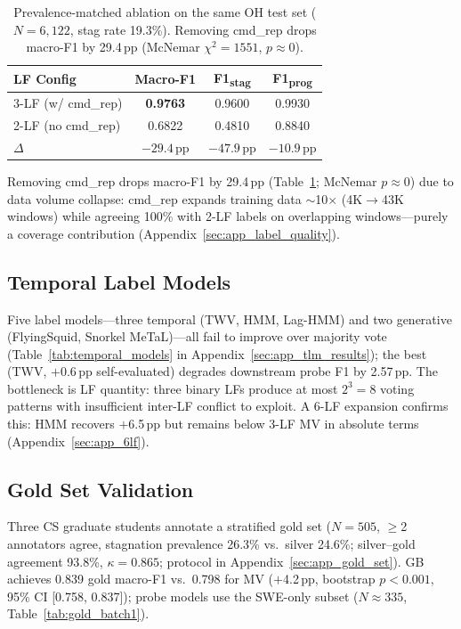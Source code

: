 \begin{table}[t]
\centering
\small
\begin{tabular}{lccc}
\toprule
\textbf{LF Config} & \textbf{Macro-F1} & \textbf{F1\textsubscript{stag}} & \textbf{F1\textsubscript{prog}} \\
\midrule
3-LF (w/ cmd\_rep) & \textbf{0.9763} & 0.9600 & 0.9930 \\
2-LF (no cmd\_rep) & 0.6822 & 0.4810 & 0.8840 \\
\midrule
$\Delta$ & $-29.4$\,pp & $-47.9$\,pp & $-10.9$\,pp \\
\bottomrule
\end{tabular}
\caption{Prevalence-matched ablation on the same OH test set ($N{=}6{,}122$, stag rate 19.3\%). Removing cmd\_rep drops macro-F1 by 29.4\,pp (McNemar $\chi^2{=}1551$, $p{\approx}0$).}
\label{tab:cmd_rep_ablation}
\end{table}

Removing cmd\_rep drops macro-F1 by 29.4\,pp (Table~\ref{tab:cmd_rep_ablation}; McNemar $p{\approx}0$) due to data volume collapse: cmd\_rep expands training data ${\sim}$10$\times$ (4K$\to$43K windows) while agreeing 100\% with 2-LF labels on overlapping windows---purely a coverage contribution (Appendix~\ref{sec:app_label_quality}).

\subsection{Temporal Label Models}
\label{sec:temporal_label_models}

Five label models---three temporal (TWV, HMM, Lag-HMM) and two generative (FlyingSquid, Snorkel MeTaL)---all fail to improve over majority vote (Table~\ref{tab:temporal_models} in Appendix~\ref{sec:app_tlm_results}); the best (TWV, $+$0.6\,pp self-evaluated) degrades downstream probe F1 by 2.57\,pp.
The bottleneck is LF quantity: three binary LFs produce at most $2^3{=}8$ voting patterns with insufficient inter-LF conflict to exploit.
A 6-LF expansion confirms this: HMM recovers $+$6.5\,pp but remains below 3-LF MV in absolute terms (Appendix~\ref{sec:app_6lf}).

\subsection{Gold Set Validation}
\label{sec:gold_set}
Three CS graduate students annotate a stratified gold set ($N{=}505$, ${\geq}$2 annotators agree, stagnation prevalence 26.3\% vs.\ silver 24.6\%; silver--gold agreement 93.8\%, $\kappa{=}0.865$; protocol in Appendix~\ref{sec:app_gold_set}).
GB achieves 0.839 gold macro-F1 vs.\ 0.798 for MV ($+$4.2\,pp, bootstrap $p{<}0.001$, 95\% CI [0.758, 0.837]); probe models use the SWE-only subset ($N{\approx}335$, Table~\ref{tab:gold_batch1}).

